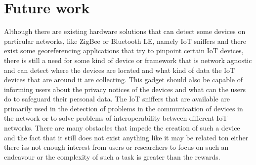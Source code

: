 \section{Future work}

Although there are existing hardware solutions that can detect some devices
on particular networks, like ZigBee or Bluetooth LE, namely IoT sniffers
and there exist some georeferencing applications that try to pinpoint certain
IoT devices, there is still a need for some kind of device or framework
that is network agnostic and can detect where the devices are located and
what kind of data the IoT devices that are around it are collecting. This
gadget should also be capable of informing users about the privacy notices
of the devices and what can the users do to safeguard their personal data.
The IoT sniffers that are available are primarily used in the detection
of problems in the communication of devices in the network or to solve problems
of interoperability between different IoT networks. There are many obstacles
that impede the creation of such a device and the fact that it still does
not exist anything like it may be related ton either there iss not enough
interest from users or researchers to focus on such an endeavour or the
complexity of such a task is greater than the rewards.
